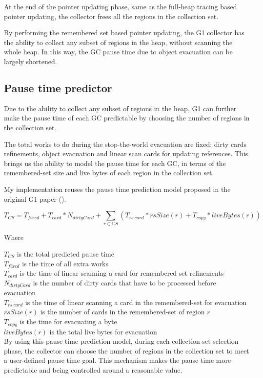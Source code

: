 At the end of the pointer updating phase, same as the full-heap tracing based
pointer updating, the collector frees all the regions in the collection set.

By performing the remembered set based pointer updating, the G1 collector has the ability to collect
any subset of regions in the heap, without scanning the whole heap. In this way, the GC pause time due to object evacuation
can be largely shortened.

\subsection{Pause time predictor}

Due to the ability to collect any subset of regions in the heap, G1 can further
make the pause time of each GC predictable by choosing the number of regions in the collection set.

The total works to do during the stop-the-world evacuation are fixed:
dirty cards refinements, object evacuation and linear scan cards for updating references.
This brings us the ability to model the pause time for each GC, in terms of the remembered-set
size and live bytes of each region in the collection set.

My implementation reuses the pause time prediction model proposed in the
original G1 paper (\cite{detlefs2004garbage}).

$$
T_{CS} = T_{fixed} + T_{card} * N_{dirtyCard} + \sum_{r\in CS} (T_{rs\ card} * rsSize(r) + T_{copy} * liveBytes(r))
$$

\noindent Where

\noindent$T_{CS}$ is the total predicted pause time\\
$T_{fixed}$ is the time of all extra works\\
$T_{card}$ is the time of linear scanning a card for remembered set refinements\\
$N_{dirtyCard}$ is the number of dirty cards that have to be processed before evacuation\\
$T_{rs\ card}$ is the time of linear scanning a card in the remembered-set for evacuation\\
$rsSize(r)$ is the number of cards in the remembered-set of region $r$\\
$T_{copy}$ is the time for evacuating a byte\\
$liveBytes(r)$ is the total live bytes for evacuation\\

By using this pause time prediction model, during each collection set selection phase,
the collector can choose the number of regions in the collection set to meet a
user-defined pause time goal. This mechanism makes the pause time more predictable
and being controlled around a reasonable value.

